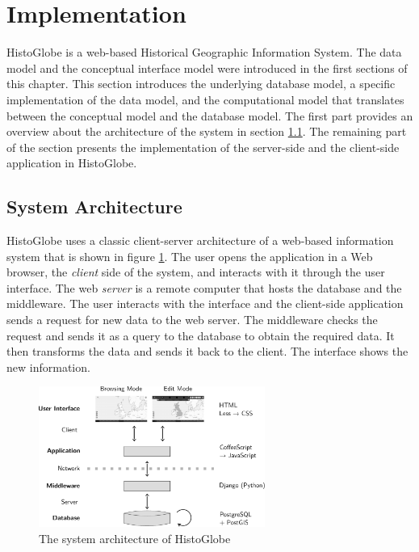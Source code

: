 
\section{Implementation} %
\label{sec:implementation}

HistoGlobe is a web-based Historical Geographic Information System. The data model and the conceptual interface model were introduced in the first sections of this chapter. This section introduces the underlying database model, a specific implementation of the data model, and the computational model that translates between the conceptual model and the database model. The first part provides an overview about the architecture of the system in section \ref{sub:system_architecture}. The remaining part of the section presents the implementation of the server-side and the client-side application in HistoGlobe.

\subsection{System Architecture} %
\label{sub:system_architecture}

HistoGlobe uses a classic client-server architecture of a web-based information system that is shown in figure \ref{fig:system_architecture}. The user opens the application in a Web browser, the \emph{client} side of the system, and interacts with it through the user interface. The web \emph{server} is a remote computer that hosts the database and the middleware. The user interacts with the interface and the client-side application sends a request for new data to the web server. The middleware checks the request and sends it as a query to the database to obtain the required data. It then transforms the data and sends it back to the client. The interface shows the new information.

\begin{figure}[H]
  \vspace{1em}
  \centering
  \includegraphics[width=0.66\textwidth]{graphics/development/implementation/system_architecture}
  \caption{The system architecture of HistoGlobe}
  \label{fig:system_architecture}
\end{figure}

